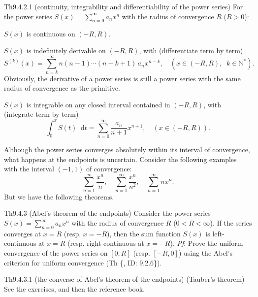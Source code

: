 \documentclass{article}
\newcommand{\dif}{\mathop{}\!\mathrm{d}}
\begin{document}
\begin{Th}{Th9.4.2.1 (continuity, integrability and differentiability of the power series)}
    For the power series $S(x) = \sum_{n=0}^{\infty} a_n x^n$ with the radius of convergence $R$ ($R>0$):
    \begin{compactenum}
        \item $S(x)$ is continuous on $(-R, R)$.
        \item $S(x)$ is indefinitely derivable on $(-R, R)$, with (differentiate term by term)
        $$ S^{(k)}(x) = \sum_{n=k}^{\infty} n(n-1)\cdots(n-k+1)\, a_n x^{n-k}, \quad \left(x\in (-R, R), \;\;k\in\mathbb{N}^\ast \right). $$
        Obviously, the derivative of a power series is still a power series with the same radius of convergence as the primitive.
        \item $S(x)$ is integrable on any closed interval contained in $(-R, R)$, with (integrate term by term)
        $$ \int_{0}^{x} S(t) \dif t = \sum_{n=0}^{\infty} \frac{a_n}{n+1} x^{n+1}, \quad (x\in (-R, R)). $$
    \end{compactenum}
\end{Th}

\begin{Rmk}{}
    \textcolor{Th}{Although the power series converges absolutely within its interval of convergence, what happens at the endpoints is uncertain. Consider the following examples with the interval $(-1, 1)$ of convergence:
    $$ \sum_{n=1}^{\infty} \frac{x^n}{n}, \quad \sum_{n=1}^{\infty} \frac{x^n}{n^2}, \quad \sum_{n=1}^{\infty} nx^n. $$}
    But we have the following theorems.
\end{Rmk}

\begin{Th}{Th9.4.3 (Abel's theorem of the endpoints)}
    Consider the power series $S(x) = \sum_{n=0}^{\infty} a_n x^n$ with the radius of convergence $R$ ($0<R<\infty$). If the series converges at $x = R$ (resp. $x = -R$), then the sum function $S(x)$ is left-continuous at $x = R$ (resp. right-continuous at $x = -R$).
    \tcblower
    \textit{Pf}: Prove the uniform convergence of the power series on $[0, R]$ (resp. $[-R, 0]$) using the Abel's criterion for uniform convergence (Th \{, ID: 9.2.6\}).
\end{Th}

\begin{Th}{Th9.4.3.1 (the converse of Abel's theorem of the endpoints) (Tauber's theorem)}
    See the exercises, and then the reference book.
\end{Th}
\end{document}
